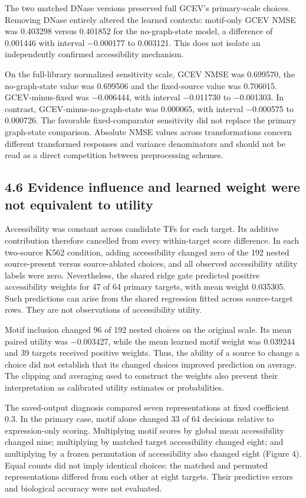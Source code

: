 \documentclass[
  11pt,
]{article}
\begin{document}
The two matched DNase versions preserved full GCEV's primary-scale
choices. Removing DNase entirely altered the learned contexts:
motif-only GCEV NMSE was 0.403298 versus 0.401852 for the no-graph-state
model, a difference of 0.001446 with interval −0.000177 to 0.003121.
This does not isolate an independently confirmed accessibility
mechanism.

On the full-library normalized sensitivity scale, GCEV NMSE was
0.699570, the no-graph-state value was 0.699506 and the fixed-source
value was 0.706015. GCEV-minus-fixed was −0.006444, with interval
−0.011730 to −0.001303. In contrast, GCEV-minus-no-graph-state was
0.000065, with interval −0.000575 to 0.000726. The favorable
fixed-comparator sensitivity did not replace the primary graph-state
comparison. Absolute NMSE values across transformations concern
different transformed responses and variance denominators and should not
be read as a direct competition between preprocessing schemes.

\subsection{4.6 Evidence influence and learned weight were not
equivalent to
utility}\label{evidence-influence-and-learned-weight-were-not-equivalent-to-utility}

Accessibility was constant across candidate TFs for each target. Its
additive contribution therefore cancelled from every within-target score
difference. In each two-source K562 condition, adding accessibility
changed zero of the 192 nested source-present versus source-ablated
choices, and all observed accessibility utility labels were zero.
Nevertheless, the shared ridge gate predicted positive accessibility
weights for 47 of 64 primary targets, with mean weight 0.035305. Such
predictions can arise from the shared regression fitted across
source-target rows. They are not observations of accessibility utility.

Motif inclusion changed 96 of 192 nested choices on the original scale.
Its mean paired utility was −0.003427, while the mean learned motif
weight was 0.039244 and 39 targets received positive weights. Thus, the
ability of a source to change a choice did not establish that its
changed choices improved prediction on average. The clipping and
averaging used to construct the weights also prevent their
interpretation as calibrated utility estimates or probabilities.

The saved-output diagnosis compared seven representations at fixed
coefficient 0.3. In the primary case, motif alone changed 33 of 64
decisions relative to expression-only scoring. Multiplying motif scores
by global mean accessibility changed nine; multiplying by matched target
accessibility changed eight; and multiplying by a frozen permutation of
accessibility also changed eight (Figure 4). Equal counts did not imply
identical choices: the matched and permuted representations differed
from each other at eight targets. Their predictive errors and biological
accuracy were not evaluated.
\end{document}
